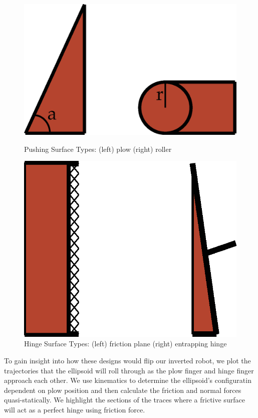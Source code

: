 \documentclass[a4paper]{article}
\begin{document}
\begin{figure}[!tbp]
  \centering
  \begin{minipage}[b]{0.4\textwidth}
    \includegraphics[width=1.0\textwidth]{PlowSurfaceTypes.eps}
    \caption{\label{fig:psurfaces}Pushing Surface Types: (left) plow (right) roller}
  \end{minipage}
  \hfill
  \begin{minipage}[b]{0.4\textwidth}
    \includegraphics[width=1.0\textwidth]{HingeSurfaceTypes.eps}
    \caption{\label{fig:surfacesh}Hinge Surface Types: (left) friction plane (right) entrapping hinge}
  \end{minipage}
\end{figure}

To gain insight into how these designs would flip our inverted robot, we plot the trajectories that the ellipsoid will roll through as the plow finger and hinge finger approach each other.
We use kinematics to determine the ellipsoid's configuratin dependent on plow position and then calculate the friction and normal forces quasi-statically.
We highlight the sections of the traces where a frictive surface will act as a perfect hinge using friction force.
\end{document}

